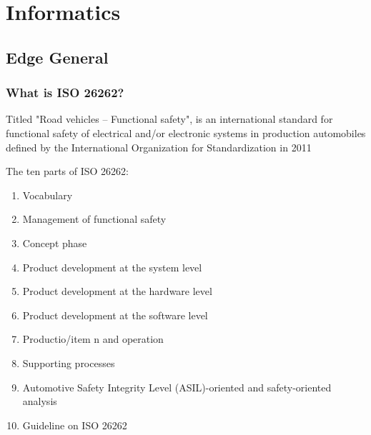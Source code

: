 \chapter{   Informatics}
\graphicspath{{./images/informatics/}}

\section{Edge General}
\subsection{What is ISO 26262?}
Titled "Road vehicles – Functional safety", is an international standard for functional safety of electrical and/or electronic systems in production automobiles defined by the International Organization for Standardization in 2011

The ten parts of ISO 26262:
\begin{enumerate}
    \item Vocabulary
    \item Management of functional safety
    \item Concept phase
    \item Product development at the system level
    \item Product development at the hardware level
    \item Product development at the software level
    \item Productio/item n and operation
    \item Supporting processes
    \item Automotive Safety Integrity Level (ASIL)-oriented and safety-oriented analysis
    \item Guideline on ISO 26262
\end{enumerate}














